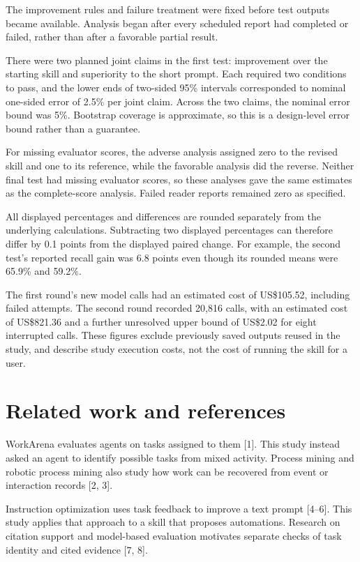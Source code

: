 \documentclass[11pt]{article}
\begin{document}
The improvement rules and failure treatment were fixed before test outputs became available. Analysis began after every scheduled report had completed or failed, rather than after a favorable partial result.

There were two planned joint claims in the first test: improvement over the starting skill and superiority to the short prompt. Each required two conditions to pass, and the lower ends of two-sided 95\% intervals corresponded to nominal one-sided error of 2.5\% per joint claim. Across the two claims, the nominal error bound was 5\%. Bootstrap coverage is approximate, so this is a design-level error bound rather than a guarantee.

For missing evaluator scores, the adverse analysis assigned zero to the revised skill and one to its reference, while the favorable analysis did the reverse. Neither final test had missing evaluator scores, so these analyses gave the same estimates as the complete-score analysis. Failed reader reports remained zero as specified.

All displayed percentages and differences are rounded separately from the underlying calculations. Subtracting two displayed percentages can therefore differ by 0.1 points from the displayed paired change. For example, the second test's reported recall gain was 6.8 points even though its rounded means were 65.9\% and 59.2\%.

The first round's new model calls had an estimated cost of US\$105.52, including failed attempts. The second round recorded 20,816 calls, with an estimated cost of US\$821.36 and a further unresolved upper bound of US\$2.02 for eight interrupted calls. These figures exclude previously saved outputs reused in the study, and describe study execution costs, not the cost of running the skill for a user.

\section*{Related work and references}
WorkArena evaluates agents on tasks assigned to them [1]. This study instead asked an agent to identify possible tasks from mixed activity. Process mining and robotic process mining also study how work can be recovered from event or interaction records [2, 3].

Instruction optimization uses task feedback to improve a text prompt [4--6]. This study applies that approach to a skill that proposes automations. Research on citation support and model-based evaluation motivates separate checks of task identity and cited evidence [7, 8].
\end{document}
